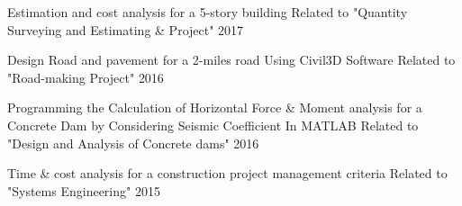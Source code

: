 \begin{cvhonors}
\vspace{10pt}    
  \cvhonor
    {Estimation and cost analysis for a 5-story building} %
    {Related to "Quantity Surveying and Estimating \& Project"} %
    {} %
    {2017} %
    
\vspace{10pt}   
  \cvhonor
    {Design Road and pavement for a 2-miles road Using Civil3D Software} %
    {Related to "Road-making Project"} %
    {} %
    {2016} %

\vspace{10pt}  
  \cvhonor
    {Programming the Calculation of Horizontal Force \& Moment analysis for a Concrete Dam by Considering Seismic Coefficient In MATLAB} %
    {Related to "Design and Analysis of Concrete dams"} %
    {} %
    {2016} %
    
\vspace{10pt}
  \cvhonor
    {Time \& cost analysis for a construction project management criteria} %
    {Related to "Systems Engineering"} %
    {} %
    {2015} %
    

\end{cvhonors}


    {} %
    {} %
    {} %
    {} %